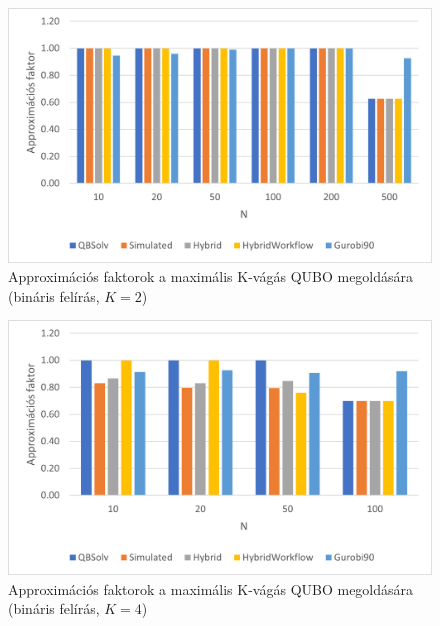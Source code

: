 \begin{figure}[!ht]
	\centering
	\includegraphics[width=150mm, keepaspectratio]{figures/diagrams/maxKCutQUBO_K2approx_bin.png}
	\caption{Approximációs faktorok a maximális K-vágás QUBO megoldására (bináris felírás, $K=2$)}
	\label{fig:maxKCutQUBO_K2approx_bin}
\end{figure}

\begin{figure}[!ht]
	\centering
	\includegraphics[width=150mm, keepaspectratio]{figures/diagrams/maxKCutQUBO_K4approx_bin.png}
	\caption{Approximációs faktorok a maximális K-vágás QUBO megoldására (bináris felírás, $K=4$)}
	\label{fig:maxKCutQUBO_K4approx_bin}
\end{figure}

